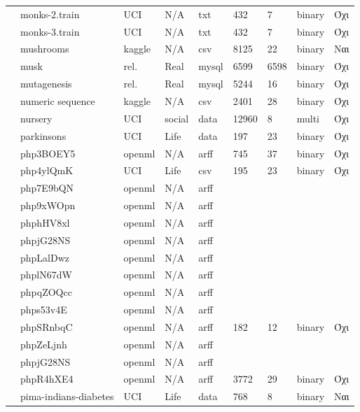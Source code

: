 {\begin{longtable}{|l| l| l | l | l | l |l | l | l | }
 			\rownumber & monks-2.train \citep{monks} & UCI & N/A & txt & 432 & 7 & binary & Όχι \\
 			\rownumber & monks-3.train \citep{monks}& UCI & N/A & txt & 432 & 7 & binary & Όχι \\
 			\rownumber & mushrooms \citep{mushroom} & kaggle & N/A & csv & 8125 & 22 & binary & Ναι \\
 			\rownumber & musk \citep{musk} & rel. & Real & mysql & 6599
 			  & 6598 & binary & Όχι \\
 			\rownumber & mutagenesis \citep{Mutagenesis} & rel. & Real & mysql & 5244 & 16 & binary & Όχι \\
 			\rownumber & numeric sequence \citep{sequence} & kaggle & N/A & csv & 2401 & 28 & binary & Όχι \\
 			\rownumber & nursery \citep{nursery} & UCI & social & data & 12960 & 8 & multi & Όχι \\
 			\rownumber & parkinsons \citep{parkinsons} & UCI & Life & data & 197 & 23 & binary & Όχι \\
 			\rownumber & php3BOEY5 \citep{pie} & openml & N/A & arff & 745  & 37  &  binary& Όχι \\
 			\rownumber & php4ylQmK \citep{thyroid} & UCI & Life & csv & 195 & 23 & binary & Όχι \\
 			\rownumber & php7E9bQN & openml & N/A & arff & & & & \\
 			\rownumber & php9xWOpn & openml & N/A & arff & & & & \\
 			\rownumber & phphHV8xl & openml & N/A & arff & & & & \\
 			\rownumber & phpjG28NS & openml & N/A & arff & & & & \\
 			\rownumber & phpLalDwz & openml & N/A & arff & & & & \\
 			\rownumber & phplN67dW & openml & N/A & arff & & & & \\
 			\rownumber & phpqZOQcc & openml & N/A & arff & & & & \\
 			\rownumber & phps53v4E & openml & N/A & arff & & & & \\
 			\rownumber & phpSRnbqC \citep{planning} & openml & N/A & arff & 182 & 12 & binary & Όχι \\
 			\rownumber & phpZeLjnh & openml & N/A & arff & & & & \\
 			\rownumber & phpjG28NS & openml & N/A & arff & & & & \\
 			\rownumber & phpR4hXE4 & openml & N/A & arff & 3772 & 29 & binary & Όχι \\
 			\rownumber & pima-indians-diabetes \citep{pima} & UCI & Life & data & 768 & 8 & binary & Ναι \\

\end{longtable}}
